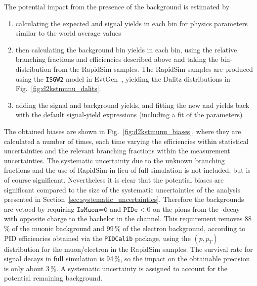 The potential impact from the presence of the background is estimated by 
\begin{enumerate}
    \item calculating the expected \BtoDpi and \BtoDK signal yields in each bin for physics parameters similar to the world average values
    \item then calculating the background bin yields in each bin, using the relative branching fractions and efficiencies described above and taking the bin-distribution from the RapidSim samples. The RapidSim samples are produced using the \texttt{ISGW2} model in EvtGen~\cite{EvtGen}, yielding the Dalitz distributions in Fig.~\ref{fig:d2kstmunu_dalits}.
    \item adding the signal and background yields, and fitting the new \BtoDpi and \BtoDK yields back with the default signal-yield expressions (including a fit of the \Fi parameters)
\end{enumerate}
The obtained biases are shown in Fig.~\ref{fig:d2kstmunu_biases}, where they are calculated a number of times, each time varying the efficiencies within statistical uncertainties and the relevant branching fractions within the measurement uncertainties. The  systematic uncertainty due to the unknown branching fractions and the use of RapidSim in lieu of full simulation is not included, but is of course significant. Nevertheless it is clear that the potential biases are significant compared to the size of the systematic uncertainties of the analysis presented in Section~\ref{sec:systematic_uncertainties}. Therefore the backgrounds are vetoed by requiring $\texttt{IsMuon=0}$ and $\texttt{PIDe} < 0$ on the pions from the \D-decay with opposite charge to the bachelor in the \DtoKspipi channel. This requirement removes 88\,\% of the muonic background and 99\,\% of the electron background, according to PID efficiencies obtained via the  \texttt{PIDCalib} package, using the $(p, p_T)$ distribution for the muon/electron in the RapidSim samples. The survival rate for signal decays in full simulation is 94\,\%, so the impact on the obtainable precision is only about $3\,\%$. A systematic uncertainty is assigned to account for the potential remaining background.

